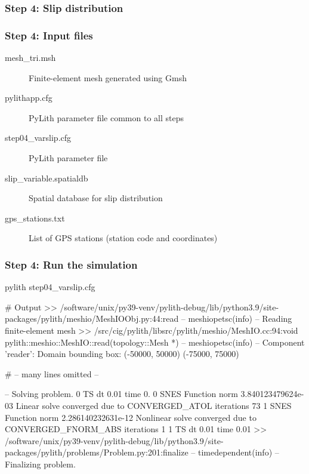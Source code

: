 \documentclass{beamer}
\begin{document}
\begin{frame}
  \frametitle{Step 4: Slip distribution}
  \summary{}

    
\end{frame}


\begin{frame}
  \frametitle{Step 4: Input files}
  \summary{}

  \begin{description}
  \item[mesh\_tri.msh] Finite-element mesh generated using Gmsh
  \item[pylithapp.cfg] PyLith parameter file common to all steps
  \item[step04\_varslip.cfg] PyLith parameter file
  \item[slip\_variable.spatialdb] Spatial database for slip distribution
  \item[gps\_stations.txt] List of GPS stations (station code and coordinates)
  \end{description}
    
\end{frame}


\begin{frame}[fragile]
  \frametitle{Step 4: Run the simulation}
  \summary{}

\begin{bashcode}
pylith step04_varslip.cfg

# Output
 >> /software/unix/py39-venv/pylith-debug/lib/python3.9/site-packages/pylith/meshio/MeshIOObj.py:44:read
 -- meshiopetsc(info)
 -- Reading finite-element mesh
 >> /src/cig/pylith/libsrc/pylith/meshio/MeshIO.cc:94:void pylith::meshio::MeshIO::read(topology::Mesh *)
 -- meshiopetsc(info)
 -- Component 'reader': Domain bounding box:
    (-50000, 50000)
    (-75000, 75000)

# -- many lines omitted --

 -- Solving problem.
0 TS dt 0.01 time 0.
    0 SNES Function norm 3.840123479624e-03
    Linear solve converged due to CONVERGED_ATOL iterations 73
    1 SNES Function norm 2.286140232631e-12
  Nonlinear solve converged due to CONVERGED_FNORM_ABS iterations 1
1 TS dt 0.01 time 0.01
 >> /software/unix/py39-venv/pylith-debug/lib/python3.9/site-packages/pylith/problems/Problem.py:201:finalize
 -- timedependent(info)
 -- Finalizing problem.
\end{bashcode}
  
\end{frame}
\end{document}
